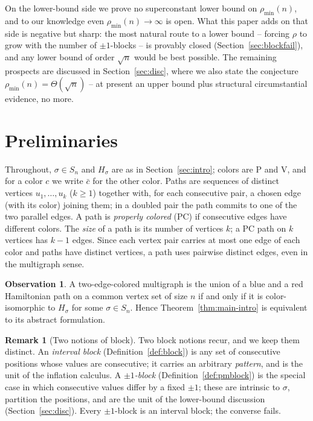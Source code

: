 \documentclass[11pt]{article}
\theoremstyle{definition}
\newtheorem{remark}[theorem]{Remark}
\newtheorem{observation}[theorem]{Observation}
\newcommand{\pmin}{\rho_{\min}}
\begin{document}
On the lower-bound side we prove no superconstant lower bound on $\pmin(n)$, and to
our knowledge even $\pmin(n) \to \infty$ is open. What this paper adds on that side is
negative but sharp: the most natural route to a lower bound -- forcing $\rho$ to grow
with the number of $\pm1$-blocks -- is provably closed
(Section~\ref{sec:blockfail}), and any lower bound of order $\sqrt n$ would be best
possible. The remaining prospects are discussed in Section~\ref{sec:disc}, where we
also state the conjecture $\pmin(n) = \Theta(\sqrt n)$ -- at present an upper bound
plus structural circumstantial evidence, no more.

\section{Preliminaries}\label{sec:prelim}

Throughout, $\sigma \in S_n$ and $H_\sigma$ are as in Section~\ref{sec:intro}; colors
are $\mathrm P$ and $\mathrm V$, and for a color $c$ we write $\bar c$ for the other
color. Paths are sequences of distinct vertices $u_1,\dots,u_k$ ($k \ge 1$) together
with, for each consecutive pair, a chosen edge (with its color) joining them; in a
doubled pair the path commits to one of the two parallel edges. A path is
\emph{properly colored} (PC) if consecutive edges have different colors. The
\emph{size} of a path is its number of vertices $k$; a PC path on $k$ vertices has
$k-1$ edges. Since each vertex pair carries at most one edge of each color and paths
have distinct vertices, a path uses pairwise distinct edges, even in the multigraph
sense.

\begin{observation}\label{obs:translate}
A two-edge-colored multigraph is the union of a blue and a red Hamiltonian path on a
common vertex set of size $n$ if and only if it is color-isomorphic to $H_\sigma$ for
some $\sigma \in S_n$. Hence Theorem~\ref{thm:main-intro} is equivalent to its
abstract formulation.
\end{observation}

\begin{remark}[Two notions of block]\label{rem:blocks}
Two block notions recur, and we keep them distinct. An \emph{interval block}
(Definition~\ref{def:block}) is any set of consecutive positions whose values are
consecutive; it carries an arbitrary \emph{pattern}, and is the unit of the inflation
calculus. A \emph{$\pm1$-block} (Definition~\ref{def:pmblock}) is the special case in
which consecutive values differ by a fixed $\pm1$; these are intrinsic to $\sigma$,
partition the positions, and are the unit of the lower-bound discussion
(Section~\ref{sec:disc}). Every $\pm1$-block is an interval block; the converse fails.
\end{remark}
\end{document}
